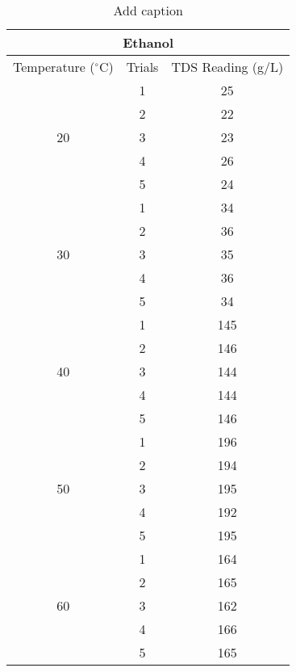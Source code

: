 \newpage

\begin{table}[H]
  \centering
  \caption{Add caption}
    \begin{tabular}{ccc}
    \toprule
    \multicolumn{3}{c}{Ethanol} \\
    \midrule
    Temperature ($^\circ$C) & Trials & TDS Reading (g/L)  \\
    \midrule
    \multirow{5}[10]{*}{20} & 1     & 25 \\
\cmidrule{2-3}          & 2     & 22 \\
\cmidrule{2-3}          & 3     & 23 \\
\cmidrule{2-3}          & 4     & 26 \\
\cmidrule{2-3}          & 5     & 24 \\
    \midrule
    \multirow{5}[10]{*}{30} & 1     & 34 \\
\cmidrule{2-3}          & 2     & 36 \\
\cmidrule{2-3}          & 3     & 35 \\
\cmidrule{2-3}          & 4     & 36 \\
\cmidrule{2-3}          & 5     & 34 \\
    \midrule
    \multirow{5}[10]{*}{40} & 1     & 145 \\
\cmidrule{2-3}          & 2     & 146 \\
\cmidrule{2-3}          & 3     & 144 \\
\cmidrule{2-3}          & 4     & 144 \\
\cmidrule{2-3}          & 5     & 146 \\
    \midrule
    \multirow{5}[10]{*}{50} & 1     & 196 \\
\cmidrule{2-3}          & 2     & 194 \\
\cmidrule{2-3}          & 3     & 195 \\
\cmidrule{2-3}          & 4     & 192 \\
\cmidrule{2-3}          & 5     & 195 \\
    \midrule
    \multirow{5}[10]{*}{60} & 1     & 164 \\
\cmidrule{2-3}          & 2     & 165 \\
\cmidrule{2-3}          & 3     & 162 \\
\cmidrule{2-3}          & 4     & 166 \\
\cmidrule{2-3}          & 5     & 165 \\
    \bottomrule
    \end{tabular}%
  \label{tab:addlabel}%
\end{table}%

